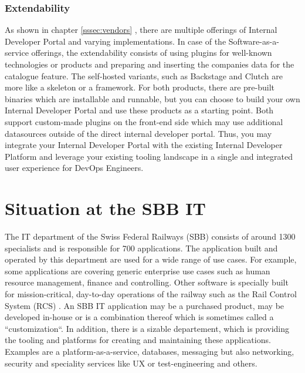 \documentclass[a4paper,12pt]{article}
\begin{document}
    \subsubsection{Extendability}
    As shown in chapter \ref{sssec:vendors} , there are multiple offerings of Internal Developer Portal and varying
    implementations.
    In case of the Software-as-a-service offerings, the extendability consists of using plugins for well-known
    technologies or products and preparing and inserting the companies data for the catalogue feature.
    The self-hosted variants, such as Backstage and Clutch are more like a skeleton or a framework.
    For both products, there are pre-built binaries which are installable and runnable, but you can choose to build your
    own Internal Developer Portal and use these products as a starting point.
    Both support custom-made plugins on the front-end side which may use additional datasources outside of the direct
    internal developer portal.
    Thus, you may integrate your Internal Developer Portal with the existing Internal Developer Platform and leverage
    your existing tooling landscape in a single and integrated user experience for DevOps Engineers.
    \pagebreak


    \section{Situation at the SBB IT}
    \label{sec:sbbit}
    The IT department of the Swiss Federal Railways (SBB) consists of around 1300 specialists and is responsible for
    700 applications\parencite{sbbitkennzahlen}.
    The application built and operated by this department are used for a wide range of use cases.
    For example, some applications are covering generic enterprise use cases such as human resource management, finance
    and controlling.
    Other software is specially built for mission-critical, day-to-day operations of the railway such as the Rail Control
    System (RCS)\parencite{sbbrcs} .
    An SBB IT application may be a purchased product, may be developed in-house or is a combination thereof which is
    sometimes called a ``customization``.
    In addition, there is a sizable departement, which is providing the tooling and platforms for creating and maintaining
    these applications.
    Examples are a platform-as-a-service, databases, messaging but also networking, security and
    speciality services like UX or test-engineering and others.
\end{document}
